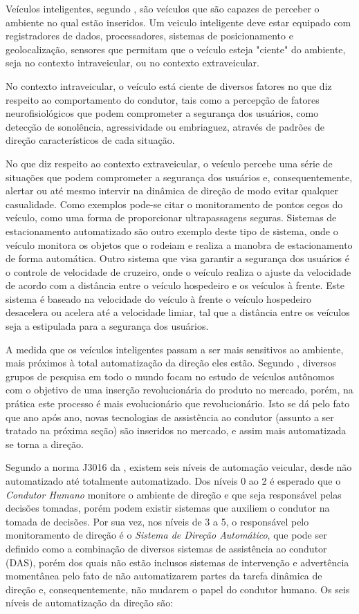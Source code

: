 Veículos inteligentes, segundo , são veículos que são capazes de perceber o ambiente no qual estão inseridos. Um veiculo inteligente deve estar equipado com registradores de dados, processadores, sistemas de posicionamento e geolocalização,  sensores que permitam que o veículo esteja "ciente" do ambiente, seja no contexto intraveicular, ou no contexto extraveicular. 

No contexto intraveicular, o veículo está ciente de diversos fatores no que diz respeito ao comportamento do condutor, tais como a percepção de fatores neurofisiológicos que podem comprometer a segurança dos usuários, como detecção de sonolência, agressividade ou embriaguez, através de padrões de direção característicos de cada situação. 

No que diz respeito ao contexto extraveicular, o veículo percebe uma série de situações que podem comprometer a segurança dos usuários e, consequentemente, alertar ou até mesmo intervir na dinâmica de direção de modo evitar qualquer casualidade. Como exemplos pode-se citar o monitoramento de pontos cegos do veículo, como uma forma de proporcionar ultrapassagens seguras. Sistemas de estacionamento automatizado são outro exemplo deste tipo de sistema, onde o veículo monitora os objetos que o rodeiam e realiza a manobra de estacionamento de forma automática. Outro sistema que visa garantir a segurança dos usuários é o controle de velocidade de cruzeiro, onde o veículo realiza o ajuste da velocidade de acordo com a distância entre o veículo hospedeiro e os veículos à frente. Este sistema é baseado na velocidade do veículo à frente o veículo hospedeiro desacelera ou acelera até a velocidade limiar, tal que a distância entre os veículos seja a estipulada para a segurança dos usuários.

A medida que os veículos inteligentes passam a ser mais sensitivos ao ambiente, mais próximos à total automatização da direção eles estão. Segundo , diversos grupos de pesquisa em todo o mundo focam no estudo de veículos autônomos com o objetivo de uma inserção revolucionária do produto no mercado, porém, na prática este processo é mais evolucionário que revolucionário. Isto se dá pelo fato que ano após ano, novas tecnologias de assistência ao condutor (assunto a ser tratado na próxima seção) são inseridos no mercado, e assim mais automatizada se torna a direção. 


Segundo a norma J3016 da , existem seis níveis de automação veicular, desde não automatizado até totalmente automatizado. Dos níveis 0 ao 2 é esperado que o \textit{Condutor Humano} monitore o ambiente de direção e que seja responsável pelas decisões tomadas, porém podem existir sistemas que auxiliem o condutor na tomada de decisões. Por sua vez, nos níveis de 3 a 5, o responsável pelo monitoramento de direção é o \textit{Sistema de Direção Automático}, que pode ser definido como a combinação de diversos sistemas de assistência ao condutor (DAS), porém dos quais não estão inclusos sistemas de intervenção e advertência momentânea pelo fato de não automatizarem partes da tarefa dinâmica de direção e, consequentemente, não mudarem o papel do condutor humano. Os seis níveis de automatização da direção são:

